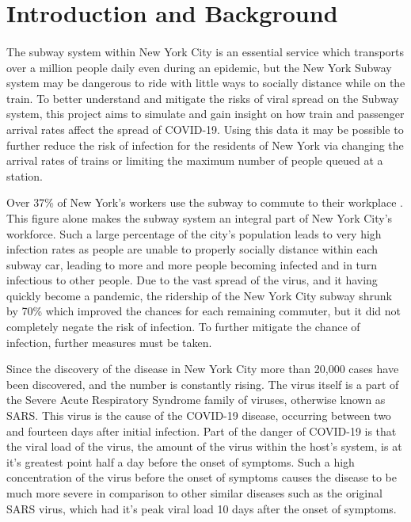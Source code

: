\documentclass[12pt]{article}
\begin{document}
\clearpage

\section{Introduction and Background}
\paragraph{}
The subway system within New York City is an essential service which transports over a million people daily even during an epidemic\cite{mta}, but the New York Subway system may be dangerous to ride with little ways to socially distance while on the train.
To better understand and mitigate the risks of viral spread on the Subway system, this project aims to simulate and gain insight on how train and passenger arrival rates affect the spread of COVID-19.
Using this data it may be possible to further reduce the risk of infection for the residents of New York via changing the arrival rates of trains or limiting the maximum number of people queued at a station.

Over 37\% of New York's workers use the subway to commute to their workplace \cite{ridership_census}. This figure alone makes the subway system an integral part of New York City's workforce.
Such a large percentage of the city's population leads to very high infection rates as people are unable to properly socially distance within each subway car, leading to more and more people becoming infected and in turn infectious to other people.
Due to the vast spread of the virus, and it having quickly become a pandemic, the ridership of the New York City subway shrunk by 70\%\cite{mta} which improved the chances for each remaining commuter, but it did not completely negate the risk of infection. To further mitigate the chance of infection, further measures must be taken.

Since the discovery of the disease in New York City more than 20,000 cases have been discovered, and the number is constantly rising\cite{disease_numbers}.
The virus itself is a part of the Severe Acute Respiratory Syndrome family of viruses, otherwise known as SARS.
This virus is the cause of the COVID-19 disease, occurring between two and fourteen days after initial infection.
Part of the danger of COVID-19 is that the viral load of the virus, the amount of the virus within the host's system, is at it's greatest point half a day before the onset of symptoms.
Such a high concentration of the virus before the onset of symptoms causes the disease to be much more severe in comparison to other similar diseases such as the original SARS virus, which had it's peak viral load 10 days after the onset of symptoms.\cite{viral_load}
\end{document}
